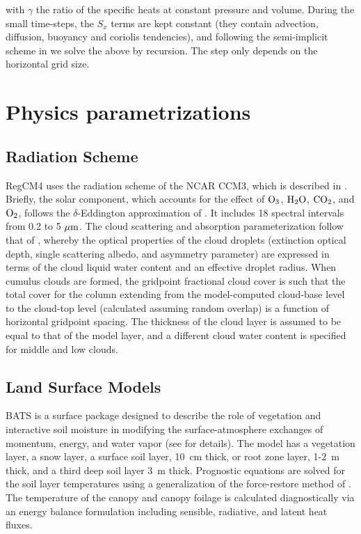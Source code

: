 with $\gamma$ the ratio of the specific heats at constant pressure and volume.
During the small time-steps, the $S_x$ terms are kept constant (they contain
advection, diffusion, buoyancy and coriolis tendencies), and following the
semi-implicit scheme in \cite{Klemp_1978} we solve the above by recursion.
The step only depends on the horizontal grid size.

\section{Physics parametrizations} \label{sec:physics}

\subsection{Radiation Scheme}

\noindent RegCM4 uses the radiation scheme of
the NCAR CCM3, which is described in \cite{Kiehl_96}.  Briefly, the solar
component, which accounts for the effect of ${\rm O_3}$, ${\rm H_2O}$, ${\rm
CO_2}$, and ${\rm O_2}$, follows the $\delta$-Eddington approximation of
\cite{Kiehl_96}.  It includes 18 spectral intervals from 0.2 to 5 $\mu {\rm m}$.
The cloud scattering and absorption parameterization follow that of
\cite{Slingo_89}, whereby the optical properties of the cloud droplets
(extinction optical depth, single scattering albedo, and asymmetry parameter)
are expressed in terms of the cloud liquid water content and an effective
droplet radius.  When cumulus clouds are formed, the gridpoint fractional cloud
cover is such that the total cover for the column extending from the
model-computed cloud-base level to the cloud-top level (calculated assuming
random overlap) is a function of horizontal gridpoint spacing.  The thickness of
the cloud layer is assumed to be equal to that of the model layer, and a
different cloud water content is specified for middle and low clouds.

\subsection{Land Surface Models}

 BATS is a surface package designed to describe
the role of vegetation and interactive soil moisture in modifying the
surface-atmosphere exchanges of momentum, energy, and water vapor (see
\cite{Dickinson_93} for details).  The model has a vegetation layer, a snow
layer, a surface soil layer, 10~cm thick, or root zone layer, 1-2~m thick, and a
third deep soil layer 3~m thick.  Prognostic equations are solved for the soil
layer temperatures using a generalization of the force-restore method of
\cite{Deardoff_78}.  The temperature of the canopy and canopy foilage is
calculated diagnostically via an energy balance formulation including sensible,
radiative, and latent heat fluxes.

